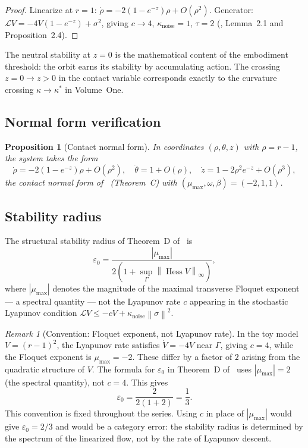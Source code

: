 \documentclass[12pt, oneside]{book}
\theoremstyle{plain}
\newtheorem{proposition}[theorem]{Proposition}
\theoremstyle{definition}
\theoremstyle{remark}
\newtheorem{remark}{Remark}[section]
\newcommand{\Orb}{\Gamma}
\newcommand{\cL}{\mathcal{L}}
\newcommand{\norm}[1]{\left\|#1\right\|}
\newcommand{\abs}[1]{\left|#1\right|}
\DeclareMathOperator{\Hess}{Hess}
\begin{document}
\begin{proof}
Linearize at $r=1$: $\dot\rho=-2(1-e^{-z})\rho+O(\rho^2)$.
Generator: $\cL V=-4V(1-e^{-z})+\sigma^2$, giving $c\to 4$,
$\kappa_{\mathrm{noise}}=1$, $\tau=2$
(\cite{Paper2}, Lemma~2.1 and Proposition~2.4).
\end{proof}

The neutral stability at $z=0$ is the mathematical content of
the embodiment threshold: the orbit earns its stability by
accumulating action. The crossing $z=0\to z>0$ in the contact
variable corresponds exactly to the curvature crossing
$\kappa\to\kappa^*$ in Volume~One.

\subsection{Normal form verification}

\begin{proposition}[Contact normal form]
\label{prop:nf}
In coordinates $(\rho,\theta,z)$ with $\rho=r-1$, the system
takes the form
\[
  \dot\rho=-2(1-e^{-z})\rho+O(\rho^2),\quad
  \dot\theta=1+O(\rho),\quad
  \dot z=1-2\rho^2 e^{-z}+O(\rho^3),
\]
the contact normal form of~\cite{Paper1} (Theorem~C) with
$(\mu_{\max},\omega,\beta)=(-2,1,1)$.
\end{proposition}

\subsection{Stability radius}

The structural stability radius of Theorem~D of~\cite{Paper1} is
\[
  \varepsilon_0
  = \frac{\abs{\mu_{\max}}}{2(1+\sup_\Orb\norm{\Hess V}_\infty)},
\]
where $\abs{\mu_{\max}}$ denotes the magnitude of the maximal
transverse Floquet exponent --- a spectral quantity --- not the
Lyapunov rate $c$ appearing in the stochastic Lyapunov condition
$\cL V \le -cV + \kappa_{\mathrm{noise}}\norm{\sigma}^2$.

\begin{remark}[Convention: Floquet exponent, not Lyapunov rate]
\label{rem:convention}
In the toy model $V=(r-1)^2$, the Lyapunov rate satisfies
$\dot V = -4V$ near $\Orb$, giving $c=4$, while the Floquet
exponent is $\mu_{\max}=-2$. These differ by a factor of $2$
arising from the quadratic structure of $V$. The formula for
$\varepsilon_0$ in Theorem~D of~\cite{Paper1} uses
$\abs{\mu_{\max}}=2$ (the spectral quantity), not $c=4$.
This gives
\[
  \varepsilon_0
  = \frac{2}{2(1+2)}
  = \frac{1}{3}.
\]
This convention is fixed throughout the series. Using $c$ in
place of $\abs{\mu_{\max}}$ would give $\varepsilon_0=2/3$ and
would be a category error: the stability radius is determined by
the spectrum of the linearized flow, not by the rate of Lyapunov
descent.
\end{remark}
\end{document}
